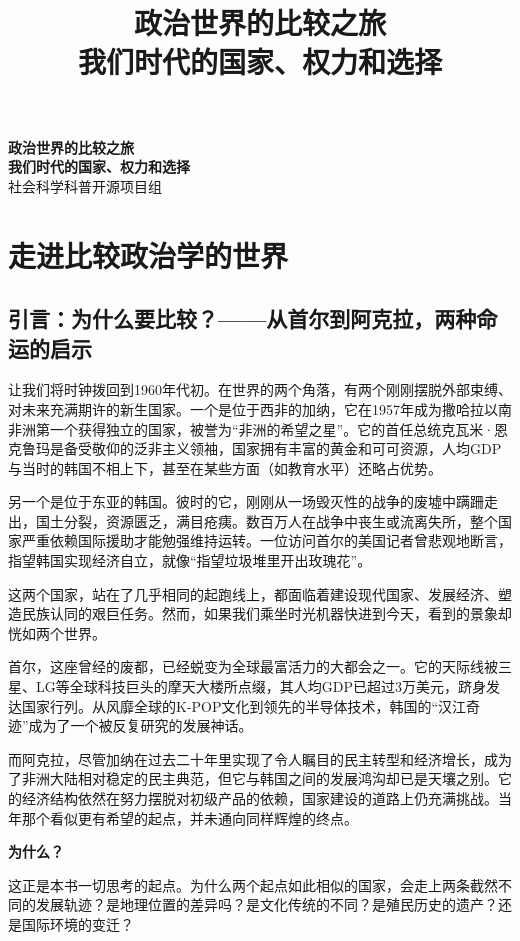 \documentclass[a5paper, 11pt, openany]{ctexbook}
\title{
    {\Huge\bfseries\songti 政治世界的比较之旅}\\[1cm]
    {\LARGE\songti 我们时代的国家、权力和选择}
}
\author{} %
\date{}   %
\newcommand{\publisher}{社会科学科普开源项目组} %
\renewcommand{\maketitle}{
    \begin{titlepage}
        \thispagestyle{empty} %
        \centering
        \vspace*{\stretch{1.5}}
        {\huge\bfseries\songti 政治世界的比较之旅}\\[1cm]
        {\large\bfseries\songti 我们时代的国家、权力和选择}\\[1cm] %

        \vfill %
        {\large \publisher} %
    \end{titlepage}
}
\begin{document}
\frontmatter %
\pagestyle{fancy} %
\maketitle
\tableofcontents

\mainmatter %
\pagestyle{fancy} %

\part{走进比较政治学的世界}

\chapter{引言：为什么要比较？——从首尔到阿克拉，两种命运的启示}

让我们将时钟拨回到1960年代初。在世界的两个角落，有两个刚刚摆脱外部束缚、对未来充满期许的新生国家。一个是位于西非的加纳，它在1957年成为撒哈拉以南非洲第一个获得独立的国家，被誉为“非洲的希望之星”。它的首任总统克瓦米·恩克鲁玛是备受敬仰的泛非主义领袖，国家拥有丰富的黄金和可可资源，人均GDP与当时的韩国不相上下，甚至在某些方面（如教育水平）还略占优势。

另一个是位于东亚的韩国。彼时的它，刚刚从一场毁灭性的战争的废墟中蹒跚走出，国土分裂，资源匮乏，满目疮痍。数百万人在战争中丧生或流离失所，整个国家严重依赖国际援助才能勉强维持运转。一位访问首尔的美国记者曾悲观地断言，指望韩国实现经济自立，就像“指望垃圾堆里开出玫瑰花”。

这两个国家，站在了几乎相同的起跑线上，都面临着建设现代国家、发展经济、塑造民族认同的艰巨任务。然而，如果我们乘坐时光机器快进到今天，看到的景象却恍如两个世界。

首尔，这座曾经的废都，已经蜕变为全球最富活力的大都会之一。它的天际线被三星、LG等全球科技巨头的摩天大楼所点缀，其人均GDP已超过3万美元，跻身发达国家行列。从风靡全球的K-POP文化到领先的半导体技术，韩国的“汉江奇迹”成为了一个被反复研究的发展神话。

而阿克拉，尽管加纳在过去二十年里实现了令人瞩目的民主转型和经济增长，成为了非洲大陆相对稳定的民主典范，但它与韩国之间的发展鸿沟却已是天壤之别。它的经济结构依然在努力摆脱对初级产品的依赖，国家建设的道路上仍充满挑战。当年那个看似更有希望的起点，并未通向同样辉煌的终点。

\textbf{为什么？}

这正是本书一切思考的起点。为什么两个起点如此相似的国家，会走上两条截然不同的发展轨迹？是地理位置的差异吗？是文化传统的不同？是殖民历史的遗产？还是国际环境的变迁？
\end{document}
